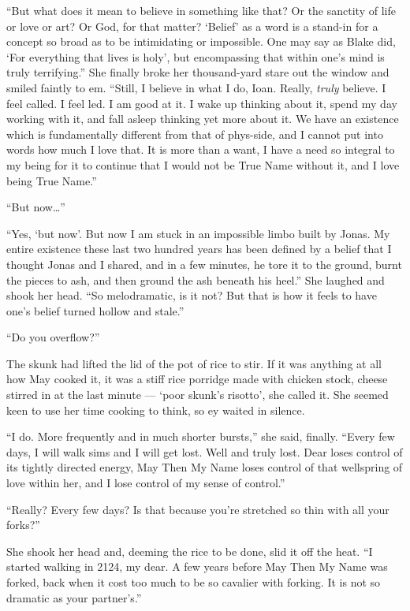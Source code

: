 ``But what does it mean to believe in something like that? Or the sanctity of life or love or art? Or God, for that matter? `Belief' as a word is a stand-in for a concept so broad as to be intimidating or impossible. One may say as Blake did, `For everything that lives is holy', but encompassing that within one's mind is truly terrifying.'' She finally broke her thousand-yard stare out the window and smiled faintly to em. ``Still, I believe in what I do, Ioan. Really, \emph{truly} believe. I feel called. I feel led. I am good at it. I wake up thinking about it, spend my day working with it, and fall asleep thinking yet more about it. We have an existence which is fundamentally different from that of phys-side, and I cannot put into words how much I love that. It is more than a want, I have a need so integral to my being for it to continue that I would not be True Name without it, and I love being True Name.''

``But now\ldots{}''

``Yes, `but now'. But now I am stuck in an impossible limbo built by Jonas. My entire existence these last two hundred years has been defined by a belief that I thought Jonas and I shared, and in a few minutes, he tore it to the ground, burnt the pieces to ash, and then ground the ash beneath his heel.'' She laughed and shook her head. ``So melodramatic, is it not? But that is how it feels to have one's belief turned hollow and stale.''

``Do you overflow?''

The skunk had lifted the lid of the pot of rice to stir. If it was anything at all how May cooked it, it was a stiff rice porridge made with chicken stock, cheese stirred in at the last minute — `poor skunk's risotto', she called it. She seemed keen to use her time cooking to think, so ey waited in silence.

``I do. More frequently and in much shorter bursts,'' she said, finally. ``Every few days, I will walk sims and I will get lost. Well and truly lost. Dear loses control of its tightly directed energy, May Then My Name loses control of that wellspring of love within her, and I lose control of my sense of control.''

``Really? Every few days? Is that because you're stretched so thin with all your forks?''

She shook her head and, deeming the rice to be done, slid it off the heat. ``I started walking in 2124, my dear. A few years before May Then My Name was forked, back when it cost too much to be so cavalier with forking. It is not so dramatic as your partner's.''

